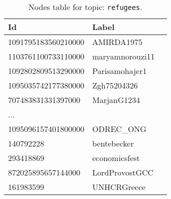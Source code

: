 %
%
\begin{table}[!htbp]
  \small
  \centering
  \caption{Topic file for \texttt{refugees}.}
  \label{topic-file}
\end{table}

%
%
\begin{table}[H]
  \caption{Nodes table for topic: \texttt{refugees}.}\label{nodestable}
  \small
  \begin{center}
  \begin{tabular}{ l l l }
  \hline
  Id & Label\\
  \hline
  1091795183560210000 & AMIRDA1975\\
  1103761100733110000 & maryamnorouzi11\\
  1092802809513290000 & Parisamohajer1\\
  1095035742177380000 & Zgh75204326\\
  707483831331397000 & MarjanG1234\\
  ... & \\
  1095096157401800000 & ODREC\_ONG\\
  140792228 & bentebecker\\
  293418869 & economicsfest\\
  872025895657144000 & LordProvostGCC\\
  161983599 & UNHCRGreece\\
  \hline
  \end{tabular}
  \end{center}
\end{table}

